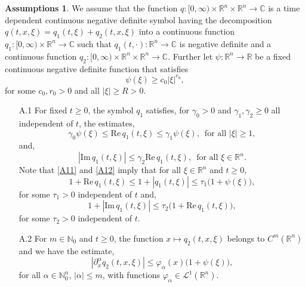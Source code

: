 \documentclass[a4paper, 12pt]{report}
\theoremstyle{cor}
\theoremstyle{remark}
\theoremstyle{definition}
\newtheorem{assume}[theorem]{Assumptions}
\begin{document}
\begin{assume}\label{TDSTDSA1}
We assume that the function $q : [0, \infty) \times \mathbb{R}^n \times \mathbb{R}^n \to \mathbb{C}$ is a time dependent continuous negative definite symbol having the decomposition $q(t, x, \xi) = q_1(t, \xi) + q_2(t, x, \xi)$ into a continuous function $q_1 : [0, \infty) \times \mathbb{R}^n \to \mathbb{C}$ such that $q_1(t, \cdot) : \mathbb{R}^n \to \mathbb{C}$ is negative definite and a continuous function $q_2 : [0, \infty) \times \mathbb{R}^n \times \mathbb{R}^n \to \mathbb{C}$.  Further let $\psi : \mathbb{R}^n \to \mathbb{R}$ be a fixed continuous negative definite function that satisfies
\begin{equation}\label{GCfNDRF}
\psi(\xi) \ge c_0|\xi|^{r_0},
\end{equation}
for some $c_0, r_0 > 0$ and all $|\xi| \ge R > 0$.
\begin{itemize}
\item[A.1] For fixed $t \ge 0$, the symbol $q_1$ satisfies, for $\gamma_0 > 0$ and $\gamma_1, \gamma_2 \ge 0$ all independent of $t$, the estimates,
\begin{equation}
\gamma_0\psi(\xi) \le \text{Re}\,q_1(t, \xi) \le \gamma_1\psi(\xi), \,\,\, \text{for all } |\xi| \ge 1,\label{A11}
\end{equation}
and,
\begin{equation}
|\text{Im}\,q_1(t, \xi)| \le \gamma_2\text{Re}\,q_1(t, \xi), \,\,\, \text{for all } \xi \in \mathbb{R}^n.\label{A12}
\end{equation}
Note that \eqref{A11} and \eqref{A12} imply that for all $\xi \in \mathbb{R}^n$ and $t \ge 0$,
\begin{equation}
1 + \text{Re}\,q_1(t, \xi) \le 1 + |q_1(t, \xi)| \le \tau_1\big(1 + \psi(\xi)\big),\label{C11}
\end{equation}
for some $\tau_1 > 0$ independent of $t$ and,
\begin{equation}
1 + |\text{Im}\,q_1(t, \xi)| \le \tau_2\big(1 + \text{Re}\,q_1(t, \xi)\big),\label{C12}
\end{equation}
for some $\tau_2 > 0$ independent of $t$.

\item[A.2] For $m \in \mathbb{N}_0$ and $t \ge 0$, the function $x \mapsto q_2(t, x, \xi)$ belongs to $C^m(\mathbb{R}^n)$ and we have the estimate,
\begin{equation}
|\partial_x^\alpha q_2(t, x, \xi)| \le \varphi_\alpha(x)\big(1 + \psi(\xi)\big),\label{A21}
\end{equation}
for all $\alpha \in \mathbb{N}_0^n$, $|\alpha| \le m$, with functions $\varphi_\alpha \in \mathcal{L}^1(\mathbb{R}^n)$.
\end{itemize}
\end{assume}
\end{document}
